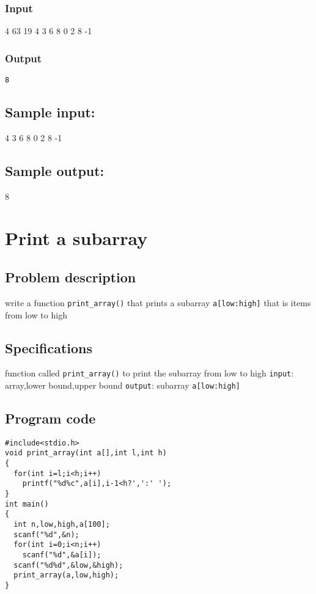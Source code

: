 \documentclass[11pt]{article}
\begin{document}
\subsubsection*{Input}
\label{sec-2-4-1}
4 63 19 4 3 6 8 0 2 8 -1
\subsubsection*{Output}
\label{sec-2-4-2}
\begin{verbatim}
8
\end{verbatim}

\subsection*{Sample input:}
\label{sec-2-5}
4 3 6 8 0 2 8 -1

\subsection*{Sample output:}
\label{sec-2-6}
8

\section{Print a subarray}
\label{sec-3}

\subsection*{Problem description}
\label{sec-3-1}
write a function \texttt{print\_array()} that prints a subarray \texttt{a[low:high]} that is 
items from low to high

\subsection*{Specifications}
\label{sec-3-2}
function called \texttt{print\_array()} to print the subarray from low to high
\texttt{input}: array,lower bound,upper bound
\texttt{output}: subarray \texttt{a[low:high]}

\subsection*{Program code}
\label{sec-3-3}

\begin{verbatim}
#include<stdio.h>
void print_array(int a[],int l,int h)
{
  for(int i=l;i<h;i++)
    printf("%d%c",a[i],i-1<h?',':' ');
}
int main()
{
  int n,low,high,a[100];
  scanf("%d",&n);
  for(int i=0;i<n;i++)
    scanf("%d",&a[i]);
  scanf("%d%d",&low,&high);
  print_array(a,low,high);
}
\end{verbatim}
\end{document}
